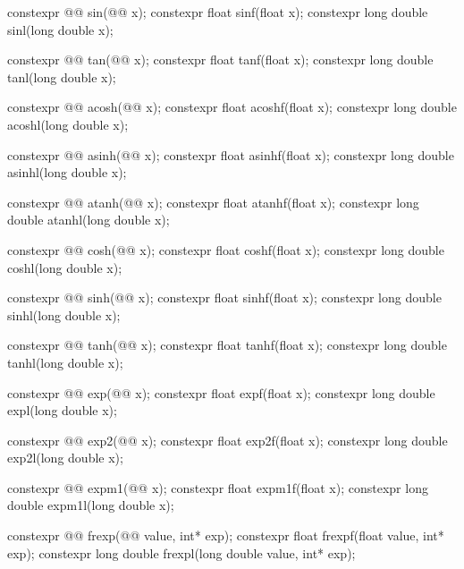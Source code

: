 \begin{codeblock}
{  constexpr @@ sin(@@ x);
  constexpr float sinf(float x);
  constexpr long double sinl(long double x);

  constexpr @@ tan(@@ x);
  constexpr float tanf(float x);
  constexpr long double tanl(long double x);

  constexpr @@ acosh(@@ x);
  constexpr float acoshf(float x);
  constexpr long double acoshl(long double x);

  constexpr @@ asinh(@@ x);
  constexpr float asinhf(float x);
  constexpr long double asinhl(long double x);

  constexpr @@ atanh(@@ x);
  constexpr float atanhf(float x);
  constexpr long double atanhl(long double x);

  constexpr @@ cosh(@@ x);
  constexpr float coshf(float x);
  constexpr long double coshl(long double x);

  constexpr @@ sinh(@@ x);
  constexpr float sinhf(float x);
  constexpr long double sinhl(long double x);

  constexpr @@ tanh(@@ x);
  constexpr float tanhf(float x);
  constexpr long double tanhl(long double x);

  constexpr @@ exp(@@ x);
  constexpr float expf(float x);
  constexpr long double expl(long double x);

  constexpr @@ exp2(@@ x);
  constexpr float exp2f(float x);
  constexpr long double exp2l(long double x);

  constexpr @@ expm1(@@ x);
  constexpr float expm1f(float x);
  constexpr long double expm1l(long double x);

  constexpr @@ frexp(@@ value, int* exp);
  constexpr float frexpf(float value, int* exp);
  constexpr long double frexpl(long double value, int* exp);

}
\end{codeblock}
